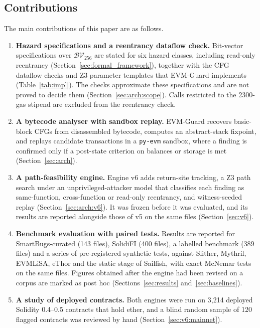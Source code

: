\documentclass[pdflatex,sn-mathphys]{sn-jnl}
\theoremstyle{thmstyletwo}
\theoremstyle{thmstyletwo}
\begin{document}
\subsection{Contributions}\label{sec:intro:contrib}
The main contributions of this paper are as follows.
\begin{enumerate}
    \item \textbf{Hazard specifications and a reentrancy dataflow check.} Bit-vector specifications over $\mathcal{BV}_{256}$ are stated for six hazard classes, including read-only reentrancy (Section~\ref{sec:formal_framework}), together with the CFG dataflow checks and Z3 parameter templates that EVM-Guard implements (Table~\ref{tab:impl}). The checks approximate these specifications and are not proved to decide them (Section~\ref{sec:arch:scope}). Calls restricted to the 2300-gas stipend are excluded from the reentrancy check.
    \item \textbf{A bytecode analyser with sandbox replay.} EVM-Guard recovers basic-block CFGs from disassembled bytecode, computes an abstract-stack fixpoint, and replays candidate transactions in a \texttt{py-evm} sandbox, where a finding is confirmed only if a post-state criterion on balances or storage is met (Section~\ref{sec:arch}).
    \item \textbf{A path-feasibility engine.} Engine v6 adds return-site tracking, a Z3 path search under an unprivileged-attacker model that classifies each finding as same-function, cross-function or read-only reentrancy, and witness-seeded replay (Section~\ref{sec:arch:v6}). It was frozen before it was evaluated, and its results are reported alongside those of v5 on the same files (Section~\ref{sec:v6}).
    \item \textbf{Benchmark evaluation with paired tests.} Results are reported for SmartBugs-curated (143 files), SolidiFI (400 files), a labelled benchmark (389 files) and a series of pre-registered synthetic tests, against Slither, Mythril, EVMLiSA, eThor and the static stage of Sailfish, with exact McNemar tests on the same files. Figures obtained after the engine had been revised on a corpus are marked as post hoc (Sections~\ref{sec:results} and~\ref{sec:baselines}).
    \item \textbf{A study of deployed contracts.} Both engines were run on 3,214 deployed Solidity 0.4--0.5 contracts that hold ether, and a blind random sample of 120 flagged contracts was reviewed by hand (Section~\ref{sec:v6:mainnet}).
\end{enumerate}
\end{document}
